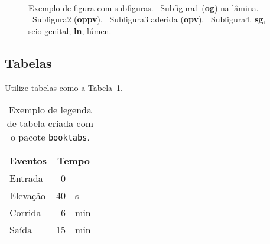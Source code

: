 \begin{figure}[htbp]
  \centering
  \vspace{11pt}
  \\
  \vspace{-18pt}
  \vspace{11pt}
  \caption[Figura com subfiguras]{Exemplo de figura com subfiguras. ~Subfigura1 (\textbf{og}) na lâmina. ~Subfigura2 (\textbf{oppv}). ~Subfigura3 aderida (\textbf{opv}). ~Subfigura4. \textbf{sg}, seio genital; \textbf{ln}, lúmen.}%
  \label{fig:tufo}
\end{figure}

\subsection{Tabelas}\label{cap2:res:tabs}

Utilize tabelas como a Tabela~\ref{tab:exemplo}.

\begin{table}[htbp]
  \caption[Tabela com \texttt{booktabs}]{Exemplo de legenda de tabela criada com o pacote \texttt{booktabs}.}
  \label{tab:exemplo}
  \vspace{1em}
  \centering
  \begin{tabular}{l r@{\,} l}
    \toprule
    Eventos     &   \multicolumn{2}{c}{Tempo}\\
    \midrule
    Entrada     &   0   &       \\
    Elevação    &   40  &   s   \\
    Corrida     &   6   &   min \\
    Saída	&   15  &   min \\
    \bottomrule
  \end{tabular}
\end{table}

